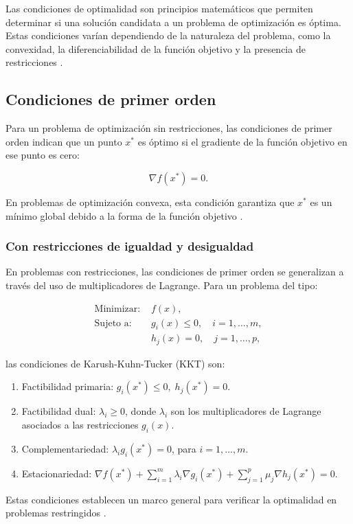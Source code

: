 Las condiciones de optimalidad son principios matemáticos que permiten determinar si una solución candidata a un problema de optimización es óptima. Estas condiciones varían dependiendo de la naturaleza del problema, como la convexidad, la diferenciabilidad de la función objetivo y la presencia de restricciones \cite{nocedal1999optimization}.

\subsection{Condiciones de primer orden}

Para un problema de optimización sin restricciones, las condiciones de primer orden indican que un punto \(x^*\) es óptimo si el gradiente de la función objetivo en ese punto es cero:

\begin{equation}
	\nabla f(x^*) = 0.
\end{equation}

En problemas de optimización convexa, esta condición garantiza que \(x^*\) es un mínimo global debido a la forma de la función objetivo \cite{boyd2004convex}.

\subsubsection{Con restricciones de igualdad y desigualdad}

En problemas con restricciones, las condiciones de primer orden se generalizan a través del uso de multiplicadores de Lagrange. Para un problema del tipo:

\begin{align}
	\text{Minimizar: } & f(x), \\
	\text{Sujeto a: } & g_i(x) \leq 0, \quad i = 1, \dots, m, \\
	& h_j(x) = 0, \quad j = 1, \dots, p,
\end{align}

las condiciones de Karush-Kuhn-Tucker (KKT) son:
\begin{enumerate}
	\item Factibilidad primaria: \(g_i(x^*) \leq 0, \; h_j(x^*) = 0\).
	\item Factibilidad dual: \(\lambda_i \geq 0\), donde \(\lambda_i\) son los multiplicadores de Lagrange asociados a las restricciones \(g_i(x)\).
	\item Complementariedad: \(\lambda_i g_i(x^*) = 0\), para \(i = 1, \dots, m\).
	\item Estacionariedad: \(\nabla f(x^*) + \sum_{i=1}^m \lambda_i \nabla g_i(x^*) + \sum_{j=1}^p \mu_j \nabla h_j(x^*) = 0\).
\end{enumerate}
Estas condiciones establecen un marco general para verificar la optimalidad en problemas restringidos \cite{nocedal1999optimization}.

